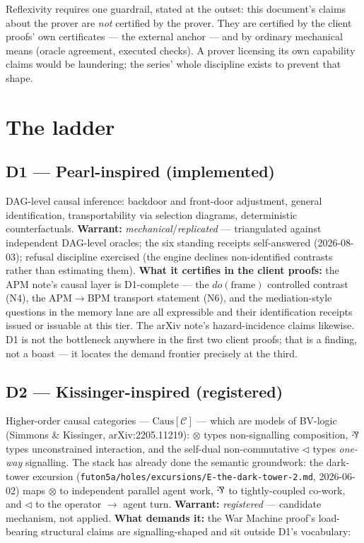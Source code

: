 \documentclass[11pt]{article}
\newcommand{\warrant}[1]{\textsl{#1}}
\newcommand{\parr}{\rotatebox[origin=c]{180}{\&}}
\newcommand{\seq}{\mathbin{\triangleleft}}
\newcommand{\Caus}{\mathrm{Caus}}
\begin{document}
Reflexivity requires one guardrail, stated at the outset: this
document's claims about the prover are \emph{not} certified by the
prover. They are certified by the client proofs' own certificates
--- the external anchor --- and by ordinary mechanical means
(oracle agreement, executed checks). A prover licensing its own
capability claims would be laundering; the series' whole discipline
exists to prevent that shape.

\section{The ladder}

\subsection*{D1 --- Pearl-inspired (implemented)}

DAG-level causal inference: backdoor and front-door adjustment,
general identification, transportability via selection diagrams,
deterministic counterfactuals. \textbf{Warrant:}
\warrant{mechanical}/\warrant{replicated} --- triangulated against
independent DAG-level oracles; the six standing receipts
self-answered (2026-08-03); refusal discipline exercised (the
engine declines non-identified contrasts rather than estimating
them). \textbf{What it certifies in the client proofs:} the APM
note's causal layer is D1-complete --- the $do(\textrm{frame})$
controlled contrast (N4), the APM$\to$BPM transport statement (N6),
and the mediation-style questions in the memory lane are all
expressible and their identification receipts issued or issuable at
this tier. The arXiv note's hazard-incidence claims likewise. D1 is
not the bottleneck anywhere in the first two client proofs; that is
a finding, not a boast --- it locates the demand frontier precisely
at the third.

\subsection*{D2 --- Kissinger-inspired (registered)}

Higher-order causal categories --- $\Caus[\mathcal{C}]$ --- which
are models of BV-logic (Simmons \& Kissinger, arXiv:2205.11219):
$\otimes$ types non-signalling composition, $\parr$ types
unconstrained interaction, and the self-dual non-commutative
$\seq$ types \emph{one-way} signalling. The stack has already done
the semantic groundwork: the dark-tower excursion
(\texttt{futon5a/holes/excursions/E-the-dark-tower-2.md},
2026-06-02) maps $\otimes$ to independent parallel agent work,
$\parr$ to tightly-coupled co-work, and $\seq$ to the operator
$\to$ agent turn. \textbf{Warrant:} \warrant{registered} ---
candidate mechanism, not applied. \textbf{What demands it:} the War
Machine proof's load-bearing structural claims are
signalling-shaped and sit outside D1's vocabulary:
\end{document}
